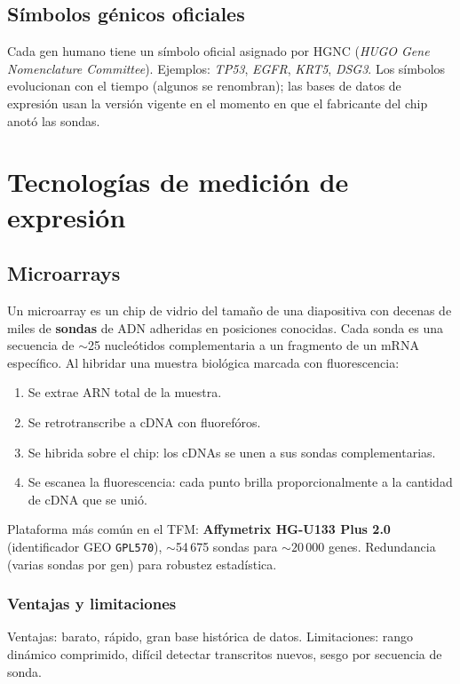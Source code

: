\documentclass[11pt, a4paper]{article}
\newcommand{\gene}[1]{\textit{#1}}
\begin{document}
\subsection{S\'imbolos g\'enicos oficiales}

Cada gen humano tiene un s\'imbolo oficial asignado por HGNC (\emph{HUGO
Gene Nomenclature Committee}). Ejemplos: \gene{TP53}, \gene{EGFR},
\gene{KRT5}, \gene{DSG3}. Los s\'imbolos evolucionan con el tiempo (algunos
se renombran); las bases de datos de expresi\'on usan la versi\'on
vigente en el momento en que el fabricante del chip anot\'o las sondas.

\section{Tecnolog\'ias de medici\'on de expresi\'on}

\subsection{Microarrays}

Un microarray es un chip de vidrio del tama\~no de una diapositiva con
decenas de miles de \textbf{sondas} de ADN adheridas en posiciones
conocidas. Cada sonda es una secuencia de $\sim$25 nucle\'otidos
complementaria a un fragmento de un mRNA espec\'ifico. Al hibridar una
muestra biol\'ogica marcada con fluorescencia:

\begin{enumerate}[leftmargin=1.4em]
  \item Se extrae ARN total de la muestra.
  \item Se retrotranscribe a cDNA con fluoref\'oros.
  \item Se hibrida sobre el chip: los cDNAs se unen a sus sondas
  complementarias.
  \item Se escanea la fluorescencia: cada punto brilla proporcionalmente
  a la cantidad de cDNA que se uni\'o.
\end{enumerate}

Plataforma m\'as com\'un en el TFM: \textbf{Affymetrix HG-U133 Plus 2.0}
(identificador GEO \texttt{GPL570}), $\sim$54\,675 sondas para ${\sim}20\,000$
genes. Redundancia (varias sondas por gen) para robustez estad\'istica.

\subsubsection*{Ventajas y limitaciones}
Ventajas: barato, r\'apido, gran base hist\'orica de datos.
Limitaciones: rango din\'amico comprimido, dif\'icil detectar
transcritos nuevos, sesgo por secuencia de sonda.
\end{document}

